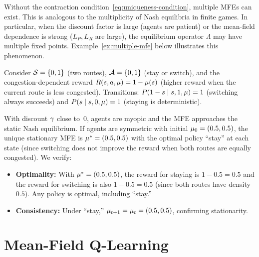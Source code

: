 \documentclass[11pt,a4paper]{article}
\begin{document}
\begin{warning}[title={Non-Uniqueness of Mean-Field Equilibria}]
Without the contraction condition~\eqref{eq:uniqueness-condition},
multiple MFEs can exist.  This is analogous to the multiplicity
of Nash equilibria in finite games.  In particular, when the
discount factor is large (agents are patient) or the
mean-field dependence is strong ($L_P, L_R$ are large), the
equilibrium operator $\Lambda$ may have multiple fixed points.
Example~\ref{ex:multiple-mfe} below illustrates this phenomenon.
\end{warning}

\begin{example}
\label{ex:congestion-mfe}
Consider $\mathcal{S} = \{0, 1\}$ (two routes), $\mathcal{A} = \{0, 1\}$
(stay or switch), and the congestion-dependent reward
$R(s, a, \mu) = 1 - \mu(s)$ (higher reward when
the current route is less congested).  Transitions:
$P(1-s \mid s, 1, \mu) = 1$ (switching always succeeds) and
$P(s \mid s, 0, \mu) = 1$ (staying is deterministic).

With discount $\gamma$ close to~$0$, agents are myopic and the
MFE approaches the static Nash equilibrium.  If agents are
symmetric with initial $\mu_0 = (0.5, 0.5)$, the unique
stationary MFE is $\mu^* = (0.5, 0.5)$ with the optimal
policy ``stay'' at each state (since switching does not improve
the reward when both routes are equally congested).  We verify:
\begin{itemize}[nosep]
  \item \textbf{Optimality:} With $\mu^* = (0.5, 0.5)$,
    the reward for staying is $1 - 0.5 = 0.5$ and the reward for
    switching is also $1 - 0.5 = 0.5$ (since both routes have
    density $0.5$).  Any policy is optimal, including ``stay.''
  \item \textbf{Consistency:} Under ``stay,'' $\mu_{t+1}
    = \mu_t = (0.5, 0.5)$, confirming stationarity.
\end{itemize}
\end{example}


\section{Mean-Field Q-Learning}
\label{sec:mf-q-learning}
\end{document}
